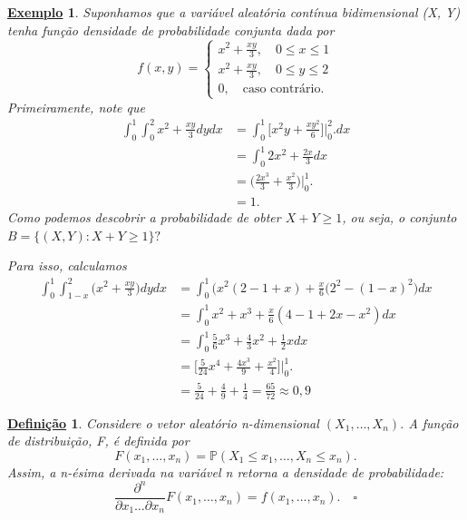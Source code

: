 \documentclass{article}
\newtheorem*{def*}{\underline{Defini\c c\~ao}}
\newtheorem{example}{\underline{Exemplo}}
\begin{document}
\begin{example}
  Suponhamos que a variável aleatória contínua bidimensional (X, Y) tenha função densidade de probabilidade conjunta dada por 
    \[
      f(x, y) = \left\{\begin{array}{ll}
              x^{2} + \frac{xy}{3},\quad 0 \leq x\leq 1\\
              x^{2} + \frac{xy}{3},\quad 0\leq y\leq 2\\
              0,\quad \text{caso contrário.}
        \end{array}\right.
    \]
  Primeiramente, note que 
  \begin{align*}
    \int_{0}^{1}\int_{0}^{2}x^{2}+\frac{xy}{3}dydx &= \int_{0}^{1}\biggl[x^{2}y + \frac{xy^{2}}{6}\biggr]\biggl|_{0}^{2}\biggr.dx\\
                                                   &= \int_{0}^{1}2x^{2}+\frac{2x}{3}dx \\
                                                   &= \biggl(\frac{2x^{3}}{3}+\frac{x^{2}}{3}\biggr)\biggl|_{0}^{1}\biggr.\\
                                                   &= 1.
  \end{align*}
  Como podemos descobrir a probabilidade de obter \(X + Y \geq 1\), ou seja, o conjunto \(B = \{(X, Y): X + Y \geq 1\}?\)

Para isso, calculamos
 \begin{align*}
   \int_{0}^{1}\int_{1 - x}^{2}\biggl(x^{2} + \frac{xy}{3}\biggr)dydx &= \int_{0}^{1}\biggl(x^{2}(2-1+x) + \frac{x}{6}(2^{2}-(1-x)^{2}\biggr)dx\\
                                                                      &= \int_{0}^{1}x^{2} + x^{3} + \frac{x}{6}(4-1+2x-x^{2})dx\\
                                                                      &= \int_{0}^{1}\frac{5}{6}x^{3} + \frac{4}{3}x^{2} + \frac{1}{2}xdx\\
                                                                      &= \biggl[\frac{5}{24}x^{4} + \frac{4x^{3}}{9} + \frac{x^{2}}{4}\biggr]\biggl|_{0}^{1}\biggr.\\
                                                                      &= \frac{5}{24} + \frac{4}{9} + \frac{1}{4} = \frac{65}{72}\approx 0,9
 \end{align*}
\end{example}
 \begin{def*}
   Considere o vetor aleatório n-dimensional \((X_{1}, \dotsc , X_{n})\). A função de distribuição, F, é definida por 
     \[
       F(x_{1}, \dotsc , x_{n}) = \mathbb{P}(X_{1} \leq x_{1},\dotsc ,X_{n}\leq x_{n}).
     \]
    Assim, a n-ésima derivada na variável n retorna a densidade de probabilidade:
      \[
        \frac{\partial^{n}}{\partial x_{1}\dotsc \partial x_{n}} F(x_{1},\dotsc ,x_{n}) = f(x_{1}, \dotsc , x_{n}).\quad \square
      \]
 \end{def*}
\end{document}
